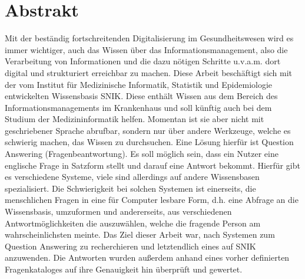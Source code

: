\chapter*{Abstrakt}
Mit der beständig fortschreitenden Digitalisierung im Gesundheitswesen wird es immer wichtiger, auch das Wissen über das Informationsmanagement,
also die Verarbeitung von Informationen und die dazu nötigen Schritte u.v.a.m. dort digital und strukturiert erreichbar zu machen.
Diese Arbeit beschäftigt sich mit der vom Institut für Medizinische Informatik, Statistik und Epidemiologie entwickelten Wissensbasis SNIK.
Diese enthält Wissen aus dem Bereich des Informationsmanagements im Krankenhaus und soll künftig auch bei dem Studium der Medizininformatik helfen.
Momentan ist sie aber nicht mit geschriebener Sprache abrufbar, sondern nur über andere Werkzeuge, welche es schwierig machen, das Wissen zu durchsuchen.
Eine Lösung hierfür ist Question Answering (Fragenbeantwortung).
Es soll möglich sein, dass ein Nutzer eine englische Frage in Satzform stellt und darauf eine Antwort bekommt.
Hierfür gibt es verschiedene Systeme, viele sind allerdings auf andere Wissensbasen spezialisiert.
Die Schwierigkeit bei solchen Systemen ist einerseits, die menschlichen Fragen in eine für Computer lesbare Form, d.h. eine Abfrage an die Wissensbasis,
umzuformen und andererseits, aus verschiedenen Antwortmöglichkeiten die auszuwählen, welche die fragende Person am wahrscheinlichsten meinte.
Das Ziel dieser Arbeit war, nach Systemen zum Question Answering zu recherchieren und letztendlich eines auf SNIK anzuwenden.
Die Antworten wurden außerdem anhand eines vorher definierten Fragenkataloges auf ihre Genauigkeit hin überprüft und gewertet.
\vfill
